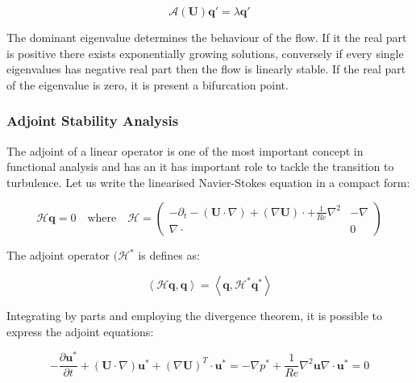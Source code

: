 \begin{equation}
   \mathcal{A}(\mathbf{U})\mathbf{q'}=\lambda \mathbf{q'}
\end{equation}

The dominant eigenvalue determines the behaviour of the flow. If it the real part is positive there exists exponentially growing solutions, conversely if every single eigenvalues has negative real part then the flow is linearly stable. If the real part of the eigenvalue is zero, it is present a bifurcation point.

\subsubsection{Adjoint Stability Analysis}

The adjoint of a linear operator is one of the most important concept in functional analysis and has an it has important role to tackle the transition to turbulence. Let us write the linearised Navier-Stokes equation in a compact form:

\begin{equation}
\mathcal{H}\mathbf{q}=0 \quad \mbox{where} \quad \mathcal{H}=\left( \begin{array}{c|c}
  -\partial_t-(\mathbf{U} \cdot \nabla)+ (\nabla \mathbf{U}) \cdot + \frac{1}{Re} \nabla^2 & -\nabla \\
  \hline
  \nabla \cdot  & 0
   \end{array}
 \right)
 \end{equation}


The adjoint operator $(\mathcal{H}^*$ is defines as:

\begin{equation}
\left \langle \mathcal{H}\mathbf{q}, \mathbf{q} \right \rangle= \left \langle \mathbf{q}, \mathcal{H}^*\mathbf{q}^* \right \rangle
\end{equation}

Integrating by parts and employing the divergence theorem, it is possible to express the adjoint equations:

\begin{subequations}
\begin{equation}
-\frac{\partial \mathbf{u}^*}{\partial t}+(\mathbf{U} \cdot \nabla)\mathbf{u}^*+(\nabla \mathbf{U})^T \cdot \mathbf{u}^*=-\nabla p^*+\frac{1}{Re} \nabla^2 \mathbf{u}
\end{equation}

\begin{equation}
\nabla \cdot \mathbf{u}^*=0
\end{equation}
\end{subequations}

